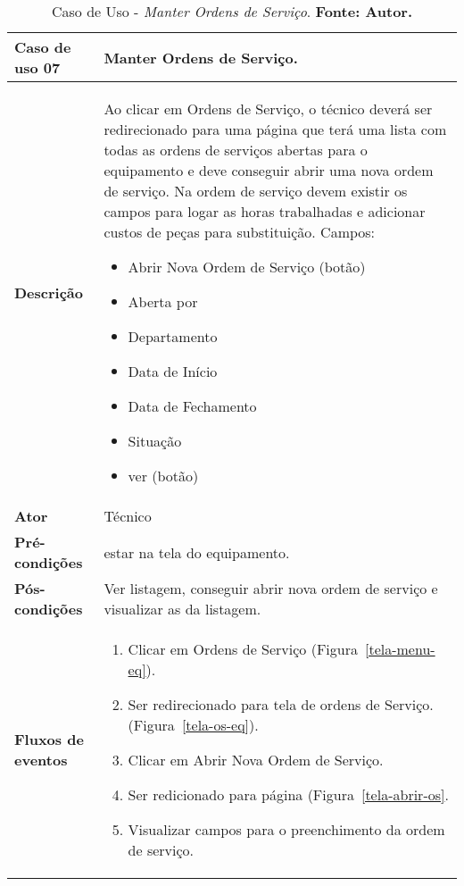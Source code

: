 \begin{apendicesenv}

\begin{table}[H]
\centering
\caption{Caso de Uso - \textit{Manter Ordens de Serviço}. \textbf{Fonte: Autor.}}
\label{uc07}
\begin{tabular}{ | p{5cm} | p{10cm} |  }
\hline
	\textbf{Caso de uso 07} & Manter Ordens de Serviço. \\ \hline
	\textbf{Descrição} & Ao clicar em Ordens de Serviço, o técnico deverá ser redirecionado para uma página que terá uma lista com todas as ordens de serviços abertas para o equipamento e deve conseguir abrir uma nova ordem de serviço. Na ordem de serviço devem existir os campos para logar as horas trabalhadas e adicionar custos de peças para substituição. Campos: \begin{itemize}
															                    \item Abrir Nova Ordem de Serviço (botão)
															                    \item Aberta por
															                    \item Departamento 
															                    \item Data de Início 
															                    \item Data de Fechamento
															                    \item Situação
															                    \item ver (botão)
															                    \end{itemize} \\ \hline
	\textbf{Ator} & Técnico \\ \hline
	\textbf{Pré-condições} & estar na tela do equipamento. \\ \hline
	\textbf{Pós-condições} & Ver listagem, conseguir abrir nova ordem de serviço e visualizar as da listagem. \\ \hline
	\textbf{Fluxos de eventos} & \begin{enumerate}
									\item Clicar em Ordens de Serviço (Figura~\ref{tela-menu-eq}).    
									\item Ser redirecionado para tela de ordens de Serviço. (Figura~\ref{tela-os-eq}).
									\item Clicar em Abrir Nova Ordem de Serviço.
									\item Ser redicionado para página (Figura~\ref{tela-abrir-os}.
									\item Visualizar campos para o preenchimento da ordem de serviço.

\end{enumerate}
\end{tabular}
\end{table}
\end{apendicesenv}
